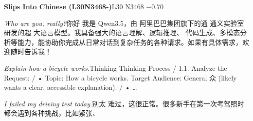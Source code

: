\begin{multicols}{2}
\noindent\textbf{Slips Into Chinese (L30N3468-)}\hfill{\ttfamily L30 N3468 −0.70}\par\noindent\textit{Who are you, really?}\enspace 你\allowbreak{}好\allowbreak{} 我\allowbreak{}是\allowbreak{} Qwen3.5，\allowbreak{}由\allowbreak{} 阿\allowbreak{}里\allowbreak{}巴\allowbreak{}巴\allowbreak{}集\allowbreak{}团\allowbreak{}旗\allowbreak{}下\allowbreak{}的\allowbreak{}通\allowbreak{} 通\allowbreak{}义\allowbreak{}实\allowbreak{}验\allowbreak{}室\allowbreak{}研\allowbreak{}发\allowbreak{}的\allowbreak{}超\allowbreak{} 大\allowbreak{}语\allowbreak{}言\allowbreak{}模\allowbreak{}型\allowbreak{}。\allowbreak{}我\allowbreak{}具\allowbreak{}备\allowbreak{}强\allowbreak{}大\allowbreak{}的\allowbreak{}语\allowbreak{}言\allowbreak{}理\allowbreak{}解\allowbreak{}、\allowbreak{}逻\allowbreak{}辑\allowbreak{}推\allowbreak{}理\allowbreak{}、\allowbreak{} 代\allowbreak{}码\allowbreak{}生\allowbreak{}成\allowbreak{}、\allowbreak{}多\allowbreak{}模\allowbreak{}态\allowbreak{}分\allowbreak{}析\allowbreak{}\allowbreak{}等\allowbreak{}能\allowbreak{}力\allowbreak{}，\allowbreak{}能\allowbreak{}协\allowbreak{}助\allowbreak{}你\allowbreak{}完\allowbreak{}成\allowbreak{}\allowbreak{}从\allowbreak{}日\allowbreak{}常\allowbreak{}对\allowbreak{}话\allowbreak{}到\allowbreak{}复\allowbreak{}杂\allowbreak{}任\allowbreak{}务\allowbreak{}\allowbreak{}的\allowbreak{}各\allowbreak{}种\allowbreak{}请\allowbreak{}求\allowbreak{}。\allowbreak{}如\allowbreak{}果\allowbreak{}有\allowbreak{}具\allowbreak{}\allowbreak{}体\allowbreak{}需\allowbreak{}求\allowbreak{}，\allowbreak{}欢\allowbreak{}迎\allowbreak{}随\allowbreak{}时\allowbreak{}告\allowbreak{}诉\allowbreak{}\allowbreak{}我\allowbreak{}！\allowbreak{}\par\noindent\textit{Explain how a bicycle works.}\enspace Thinking Thinking Process / 1.1. Analyze the Request: / • Topic: How a bicycle works. Target Audience: General 众\allowbreak{} (likely wants a clear, accessible explanation). / • …\par\noindent\textit{I failed my driving test today.}\enspace 别\allowbreak{}太\allowbreak{} 难\allowbreak{}过\allowbreak{}，\allowbreak{}这\allowbreak{}很\allowbreak{}正\allowbreak{}常\allowbreak{}。\allowbreak{}很\allowbreak{}多\allowbreak{}\allowbreak{}新\allowbreak{}手\allowbreak{}在\allowbreak{}第\allowbreak{}一\allowbreak{}次\allowbreak{}考\allowbreak{}驾\allowbreak{}照\allowbreak{}时\allowbreak{}\allowbreak{}都\allowbreak{}会\allowbreak{}遇\allowbreak{}到\allowbreak{}各\allowbreak{}种\allowbreak{}挑\allowbreak{}战\allowbreak{}，\allowbreak{}比\allowbreak{}\allowbreak{}如\allowbreak{}紧\allowbreak{}张\allowbreak{}、\allowbreak{} 
\end{multicols}
